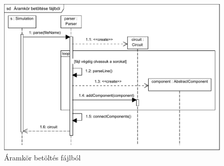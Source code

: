 \begin{figure}[H]
\begin{center}
\includegraphics[width=17cm]{chapters/chapter04/seqdiagrams/aramkor_betoltes.pdf}
\caption{Áramkör betöltés fájlból}
\label{fig:aramkor_betoltes}
\end{center}
\end{figure}



